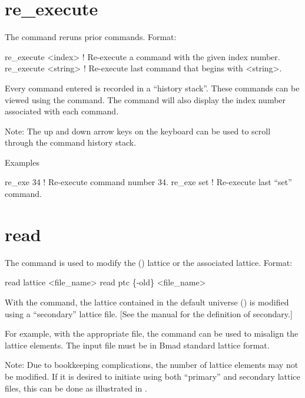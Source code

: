\section{re_execute}
\label{s:re.exe}

The  command reruns prior commands.  Format:
\begin{example}
  re_execute <index>   ! Re-execute a command with the given index number.
  re_execute <string>  ! Re-execute last command that begins with <string>.
\end{example}

\vskip 10pt Every \tao command entered is recorded in a ``history stack''. These commands can be
viewed using the  command. The  command will also display the
index number associated with each command.

Note: The up and down arrow keys on the keyboard can be used to scroll through the command history
stack.

Examples
\begin{example}
  re_exe 34   ! Re-execute command number 34.
  re_exe set  ! Re-execute last ``set'' command.  
\end{example}

\section{read}
\label{s:read}

The  command is used to modify the (\bmad)  lattice or the associated
 lattice.  Format:
\begin{example}
  read lattice <file_name>
  read ptc \{-old\} <file_name>
\end{example}

\vskip 10pt 

With the  command, the  lattice contained in the default
universe () is modified using a ``secondary'' lattice file.  [See the
\bmad manual for the definition of secondary.]

For example, with the appropriate file, the  command can be used to misalign the
lattice elements. The input file must be in Bmad standard lattice format.

Note: Due to bookkeeping complications, the number of lattice elements may not be
modified. If it is desired to initiate \tao using both ``primary'' and secondary lattice
files, this can be done as illustrated in .

